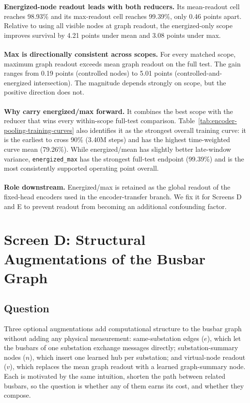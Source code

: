 \textbf{Energized-node readout leads with both reducers.} Its mean-readout cell reaches 98.93\% and its max-readout cell reaches 99.39\%, only 0.46 points apart. Relative to using all visible nodes at graph readout, the energized-only scope improves survival by 4.21 points under mean and 3.08 points under max.
\\
\\
\textbf{Max is directionally consistent across scopes.} For every matched scope, maximum graph readout exceeds mean graph readout on the full test. The gain ranges from 0.19 points (controlled nodes) to 5.01 points (controlled-and-energized intersection). The magnitude depends strongly on scope, but the positive direction does not.
\\
\\
\textbf{Why carry energized/max forward.} It combines the best scope with the reducer that wins every within-scope full-test comparison. Table~\ref{tab:encoder-pooling-training-curves} also identifies it as the strongest overall training curve: it is the earliest to cross 90\% (3.40M steps) and has the highest time-weighted curve mean (79.26\%). While energized/mean has slightly better late-window variance, \texttt{energized\_max} has the strongest full-test endpoint (99.39\%) and is the most consistently supported operating point overall. 
\\
\\
\noindent\textbf{Role downstream.} Energized/max is retained
as the global readout of the fixed-head encoders used in the encoder-transfer
branch. We fix it for Screens D and E to prevent readout from becoming an additional confounding factor.

\section{Screen D: Structural Augmentations of the Busbar Graph}
\label{sec:screen-cus-structure}

\subsection*{Question}

Three optional augmentations add computational structure to the busbar graph
without adding any physical measurement: same-substation edges ($e$), which let
the busbars of one substation exchange messages directly; substation-summary
nodes ($n$), which insert one learned hub per substation; and virtual-node
readout ($v$), which replaces the mean graph readout with a learned graph-summary node.
Each is motivated by the same intuition, shorten the path between related
busbars, so the question is whether any of them earns its cost, and whether
they compose.

